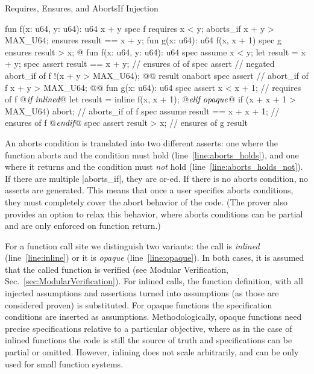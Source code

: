 \begin{Figure}
  \caption{Requires, Ensures, and AbortsIf Injection}
  \label{fig:RequiresEnsuresAbortsIf}
  \centering
\begin{MoveBox}
  fun f(x: u64, y: u64): u64 { x + y }
  spec f {
    requires x < y;
    aborts_if x + y > MAX_U64;
    ensures result == x + y;
  }
  fun g(x: u64): u64 { f(x, x + 1) }
  spec g {
    ensures result > x;
  }
  @\transform@
  fun f(x: u64, y: u64): u64 {
    spec assume x < y;
    let result = x + y;
    spec assert result == x + y;     // ensures of of
    spec assert                      // negated abort_if of f
      !(x + y > MAX_U64); @\label{line:aborts_holds_not}@
    result
  } onabort {
    spec assert                      // abort_if of f
      x + y > MAX_U64; @\label{line:aborts_holds}@
  }
  fun g(x: u64): u64 {
    spec assert x < x + 1;           // requires of f
@$\textrm{\it if inlined}$\label{line:inline}@
    let result = inline f(x, x + 1);
@$\textrm{\it elif opaque}$\label{line:opaque}@
    if (x + x + 1 > MAX_U64) abort;  // aborts_if of f
    spec assume result == x + x + 1; // ensures of f
@$\textrm{\it endif}$@
    spec assert result > x;          // ensures of g
    result
  }
\end{MoveBox}
\end{Figure}

An aborts condition is translated into two different asserts: one where the
function aborts and the condition must hold (line~\ref{line:aborts_holds}), and
one where it returns and the condition must \emph{not} hold
(line~\ref{line:aborts_holds_not}). If there are multiple |aborts_if|, they are
or-ed. If there is no aborts condition, no asserts are generated. This means
that once a user specifies aborts conditions, they must completely cover the
abort behavior of the code. (The prover also provides an option to relax this
behavior, where aborts conditions can be partial and are only enforced on
function return.)

For a function call site we distinguish two variants: the call is \emph{inlined}
(line~\ref{line:inline}) or it is \emph{opaque} (line~\ref{line:opaque}). In
both cases, it is assumed that the called function is verified (see Modular
Verification, Sec.~\ref{sec:ModularVerification}). For inlined calls, the
function definition, with all injected assumptions and assertions turned into
assumptions (as those are considered proven) is substituted. For opaque
functions the specification conditions are inserted as
assumptions. Methodologically, opaque functions need precise specifications
relative to a particular objective, where as in the case of inlined functions
the code is still the source of truth and specifications can be partial or
omitted. However, inlining does not scale arbitrarily, and can be only used for
small function systems.

